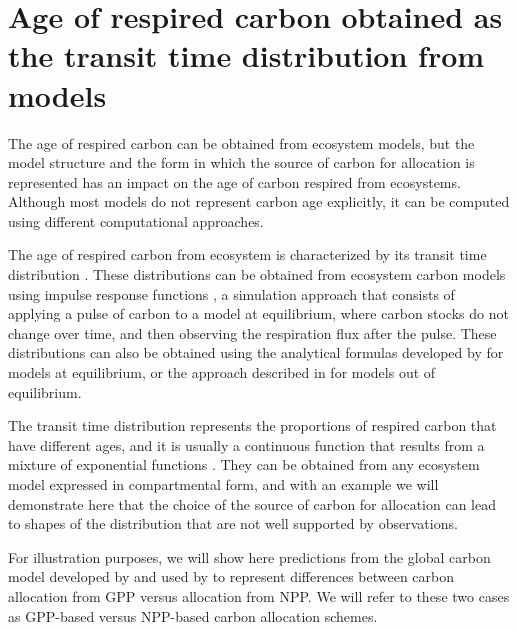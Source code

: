 \documentclass[12pt, a4paper]{article}
\newcommand{\red}[1]{{\color{red}#1}}
\begin{document}


\section{Age of respired carbon obtained as the transit time distribution from models}
The age of respired carbon can be obtained from ecosystem models, but the model structure and the form in which the source of carbon for allocation is represented has an impact on the age of carbon respired from ecosystems. Although most models do not represent carbon age explicitly, it can be computed using different computational approaches.

The age of respired carbon from ecosystem is characterized by its transit time distribution \citep{Bolin1973, Thompson1999, Sierra2021JE}. These distributions can be obtained from ecosystem carbon models using impulse response functions \citep{Thompson1999}, a simulation approach that consists of applying a pulse of carbon to a model at equilibrium, where carbon stocks do not change over time, and then observing the respiration flux after the pulse. These distributions can also be obtained using the analytical formulas developed by \citet{Metzler2018MG} for models at equilibrium, or the approach described in \citet{Metzler2018PNAS} for models out of equilibrium.

The transit time distribution represents the proportions of respired carbon that have different ages, and it is usually a continuous function that results from a mixture of exponential functions \citep{Metzler2018MG}. They can be obtained from any ecosystem model expressed in compartmental form, and with an example we will demonstrate here that the choice of the source of carbon for allocation can lead to shapes of the distribution that are not well supported by observations.

For illustration purposes, we will show here predictions from the global carbon model developed by \citet{Emanuel1981} and used by \citet{Thompson1999} to represent differences between carbon allocation from GPP versus allocation from NPP. We will refer to these two cases as GPP-based versus NPP-based carbon allocation schemes. 
\end{document}
